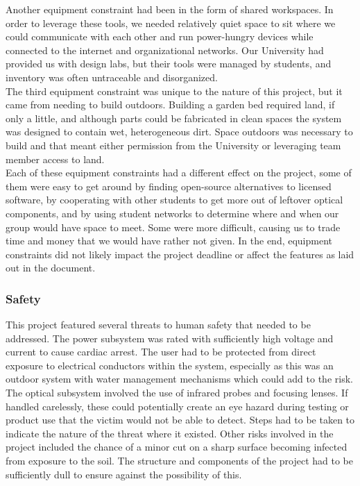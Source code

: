 Another equipment constraint had been in the form of shared workspaces. In order to leverage these tools, we needed relatively quiet space to sit where we could communicate with each other and run power-hungry devices while connected to the internet and organizational networks. Our University had provided us with design labs, but their tools were managed by students, and inventory was often untraceable and disorganized.\\

The third equipment constraint was unique to the nature of this project, but it came from needing to build outdoors. Building a garden bed required land, if only a little, and although parts could be fabricated in clean spaces the system was designed to contain wet, heterogeneous dirt. Space outdoors was necessary to build and that meant either permission from the University or leveraging team member access to land.\\

Each of these equipment constraints had a different effect on the project, some of them were easy to get around by finding open-source alternatives to licensed software, by cooperating with other students to get more out of leftover optical components, and by using student networks to determine where and when our group would have space to meet. Some were more difficult, causing us to trade time and money that we would have rather not given. In the end, equipment constraints did not likely impact the project deadline or affect the features as laid out in the document.\\
\subsubsection{Safety}
This project featured several threats to human safety that needed to be addressed. The power subsystem was rated with sufficiently high voltage and current to cause cardiac arrest. The user had to be protected from direct exposure to electrical conductors within the system, especially as this was an outdoor system with water management mechanisms which could add to the risk. The optical subsystem involved the use of infrared probes and focusing lenses. If handled carelessly, these could potentially create an eye hazard during testing or product use that the victim would not be able to detect. Steps had to be taken to indicate the nature of the threat where it existed. Other risks involved in the project included the chance of a minor cut on a sharp surface becoming infected from exposure to the soil. The structure and components of the project had to be sufficiently dull to ensure against the possibility of this.\\

